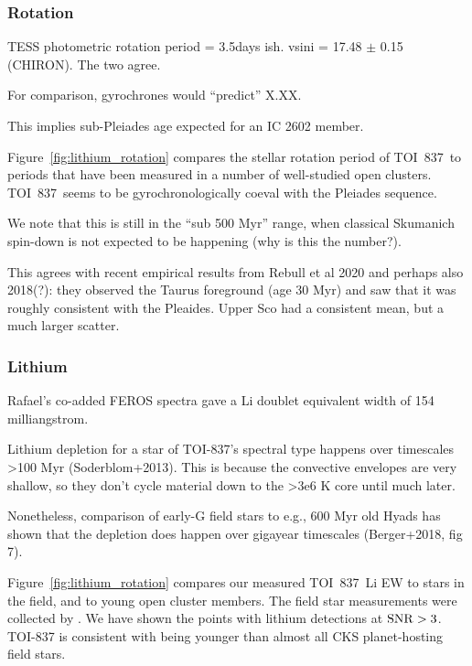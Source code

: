 \documentclass[12pt,twocolumn,tighten]{aastex63}
\newcommand{\tn}{TOI~837} %
\begin{document}
\subsubsection{Rotation}

TESS photometric rotation period = 3.5days ish.
vsini = 17.48 $\pm$ 0.15 (CHIRON).
The two agree.

For comparison, gyrochrones would ``predict'' X.XX.

This implies sub-Pleiades age expected for an IC 2602 member.

Figure~\ref{fig:lithium_rotation} compares the stellar rotation period of \tn\ to
periods that have been measured in a number of well-studied open clusters.
\tn\ seems to be gyrochronologically coeval with the Pleiades sequence.

We note that this is still in the ``sub 500 Myr'' range, when classical
Skumanich spin-down is not expected to be happening (why is this the number?).

This agrees with recent empirical results from Rebull et al 2020 and perhaps also 2018(?):
they observed the Taurus foreground (age 30 Myr) and saw that it was 
roughly consistent with the Pleaides.
Upper Sco had a consistent mean, but a much larger scatter.



\subsubsection{Lithium}

Rafael's co-added FEROS spectra gave a Li doublet equivalent width of
154 milliangstrom.

Lithium depletion for a star of TOI-837's spectral type happens
over timescales >100 Myr (Soderblom+2013). This is because the
convective envelopes are very shallow, so they don't cycle material
down to the >3e6 K core until much later.

Nonetheless, comparison of early-G field stars to e.g., 600 Myr old
Hyads has shown that the depletion does happen over gigayear timescales
(Berger+2018, fig 7).

Figure~\ref{fig:lithium_rotation} compares our measured \tn\ Li EW 
to stars in the field, and to young open cluster members.
The field star measurements were collected by
\citet{berger_identifying_2018}.
We have shown the points with lithium detections at ${\rm SNR}>3$.
TOI-837 is consistent with being younger than almost all CKS
planet-hosting field stars.
\end{document}
